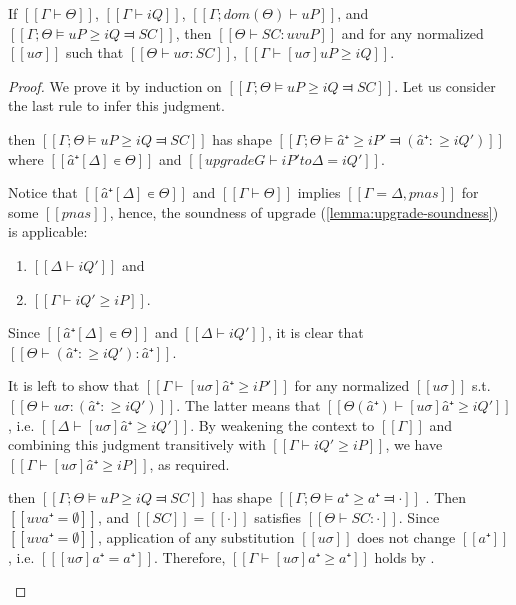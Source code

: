 \begin{lemma} \label{lemma:pos-subt-soundness}
    If $[[Γ ⊢ Θ]]$, $[[Γ ⊢ iQ]]$, $[[Γ ; dom(Θ) ⊢  uP]]$, and 
    $[[Γ ; Θ ⊨ uP ≥ iQ ⫤ SC]]$,
    then $[[Θ ⊢ SC : uv uP]]$ and
    for any normalized $[[uσ]]$ such that $[[ Θ ⊢ uσ : SC ]]$,
    $[[ Γ ⊢ [uσ]uP ≥ iQ ]]$.
\end{lemma}
\begin{proof} 
    We prove it by induction on $[[Γ ; Θ ⊨ uP ≥ iQ ⫤ SC]]$. 
    Let us consider the last rule to infer this judgment.
    \begin{caseof}
    \item {} then
        $[[Γ ; Θ ⊨ uP ≥ iQ ⫤ SC]]$ has shape $[[Γ;Θ ⊨ â⁺ ≥ iP' ⫤ (â⁺ :≥ iQ')]]$ where
        $[[â⁺[Δ] ∊ Θ]]$ and $[[upgrade G ⊢ iP' to Δ = iQ']]$.

        Notice that $[[â⁺[Δ] ∊ Θ]]$ and $[[Γ ⊢ Θ]]$ 
        implies $[[Γ = Δ, pnas]]$ for some $[[pnas]]$, hence, the
        soundness of upgrade (\cref{lemma:upgrade-soundness}) is applicable:
        \begin{enumerate}
            \item $[[Δ ⊢ iQ']]$ and
            \item $[[Γ ⊢ iQ' ≥ iP]]$.
        \end{enumerate}

        Since $[[â⁺[Δ] ∊ Θ]]$ and $[[Δ ⊢ iQ']]$, 
        it is clear that $[[ Θ ⊢ (â⁺ :≥ iQ') : â⁺]]$.

        It is left to show that $[[Γ ⊢ [uσ]â⁺ ≥ iP']]$ for any normalized $[[uσ]]$ 
        s.t. $[[ Θ   ⊢ uσ : (â⁺ :≥ iQ') ]]$.
        The latter means that $[[ Θ(â⁺) ⊢ [uσ]â⁺ ≥ iQ' ]]$, i.e. $[[Δ ⊢ [uσ]â⁺ ≥ iQ']]$. 
        By weakening the context to $[[Γ]]$ and combining this judgment
        transitively with $[[Γ ⊢ iQ' ≥ iP]]$, we have $[[Γ ⊢ [uσ]â⁺ ≥ iP]]$,
        as required. 

    \item \label{case:pos-subt-soundness:var}   
        then $[[Γ ; Θ ⊨ uP ≥ iQ ⫤ SC]]$ has shape $[[Γ;Θ ⊨ a⁺ ≥ a⁺ ⫤ ·]]$ .
        Then $[[uv a⁺ = ∅]]$, and $[[SC]] = [[·]]$ satisfies $[[Θ ⊢ SC : ·]]$.
        Since $[[uv a⁺ = ∅]]$, application of any substitution $[[uσ]]$ 
        does not change $[[a⁺]]$, i.e. $[[ [uσ] a⁺ = a⁺]]$.
        Therefore, $[[Γ ⊢ [uσ]a⁺ ≥ a⁺]]$ holds by .


\end{caseof}
\end{proof}
